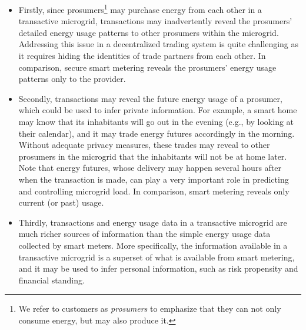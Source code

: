 \begin{itemize}[itemsep=0.25\parskip,topsep=-0.5\parskip]
\item Firstly, since prosumers\footnote{We refer to customers as \emph{prosumers} to emphasize that they can not only consume energy, but may also produce it.}  may purchase energy from each other in a transactive microgrid, transactions may inadvertently reveal the prosumers' detailed energy usage patterns to other prosumers within the microgrid.
Addressing this issue in a decentralized trading system is quite challenging as it requires hiding the identities of trade partners from each other.
In comparison, secure smart metering reveals the prosumers' energy usage patterns  only to the provider. 
\item Secondly,  transactions may reveal the future energy usage of a prosumer, which could be used to infer private information.
For example, a smart home may know that its inhabitants will go out in the evening (e.g., by looking at their calendar), and it may trade energy futures accordingly in the morning.
Without adequate privacy measures, these trades may reveal to other prosumers in the microgrid that the inhabitants will not be at home later.
Note that energy futures, whose delivery may happen several hours after when the transaction is made, can play a very important role in predicting and controlling microgrid load.
In comparison, smart metering reveals only current (or past) usage.
\item Thirdly, transactions and energy usage data in a transactive microgrid are much richer sources of information than the simple energy usage data collected by smart meters.
More specifically, the information available in a transactive microgrid is a superset of what is available from smart metering, and it may be used to infer personal information, such as risk propensity and financial standing.
\end{itemize}
\vspace{0.5\parskip}

